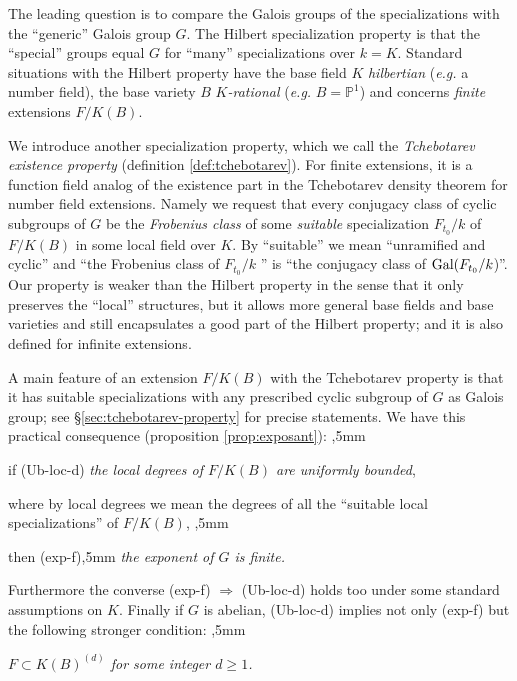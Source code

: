 \documentclass[12pt,english]{amsart}
\newtheorem{twisting lemma}[theorem]{Twisting lemma}
\begin{document}
The leading question is to compare the Galois groups of the specializations with the ``generic'' Galois group $G$. The Hilbert specialization property is that the ``special'' groups equal $G$ for ``many'' specializations over $k=K$. Standard situations with the Hilbert property have the base field $K$ {\it hilbertian} ({\it e.g.} a number field), the base variety $B$  
{\it $K$-rational} ({\it e.g.} $B={\mathbb{P}}^1$) and concerns {\it finite} extensions $F/K(B)$.

We introduce another specialization property, which we call the {\it Tchebotarev existence property} (definition \ref{def:tchebotarev}). 
For finite extensions, it is a function field analog of the existence part in the Tchebotarev density theorem for number field extensions. Namely
we request that every conjugacy class of cyclic subgroups of $G$ be the {\it Frobenius class} of some {\it suitable} specialization $F_{t_0}/k$ of $F/K(B)$ in some local field over $K$. By ``suitable'' we mean  ``unramified and cyclic'' and ``the Frobenius class of $F_{t_0}/k$ ''  is ``the conjugacy class of ${\hbox{\rm Gal}}(F_{t_0}/k$)''.  Our property is weaker than the Hilbert property in the sense that it only preserves 
the ``local'' structures, but it allows more general base fields and base varieties and still 
 encapsulates a good part of the Hilbert property; and it is also defined for infinite extensions. 

A main feature of an extension $F/K(B)$ with the Tchebotarev property is that it has suitable specializations with any prescribed cyclic 
subgroup of $G$ as Galois group; see \S \ref{sec:tchebotarev-property} for precise statements. We have this practical consequence (proposition \ref{prop:exposant}): 
,5mm

\noindent
if  \hskip 9mm {\rm (Ub-loc-d)} {\it the local degrees of $F/K(B)$ are uniformly bounded},
\vskip 1mm 

\noindent
where by local degrees we mean the degrees of all the ``suitable local specializations'' of $F/K(B)$,
,5mm

\noindent
then  \hskip 3mm {\rm (exp-f)},5mm {\it the exponent of $G$ is finite.}
\vskip 2mm

\noindent
Furthermore the converse {\rm (exp-f)} $\Rightarrow$ {\rm (Ub-loc-d)} holds too under some standard assumptions on $K$. Finally if $G$ is abelian, {\rm (Ub-loc-d)} implies not only {\rm (exp-f)} but the following stronger condition: 
,5mm 

\noindent
\hskip 13mm {\it  $F\subset K(B)^{(d)}$ for some integer $d\geq 1$.}
\vskip 2mm
\end{document}
